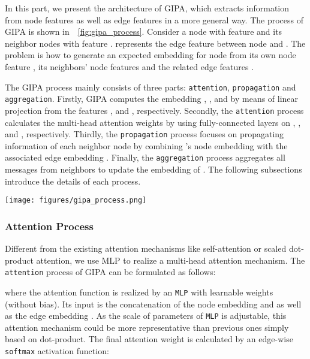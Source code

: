 \documentclass[sigconf]{acmart}
\newcommand{\model}{GIPA\xspace}
\begin{document}
In this part, we present the architecture of \model, which  extracts information from node features as well as edge features in a more general way. The process of \model is shown in~\figurename~\ref{fig:gipa_process}. Consider a node  with feature  and its neighbor nodes  with feature .  represents the edge feature between node  and . The problem is how to generate an expected embedding for node  from its own node feature , its neighbors' node features  and the related edge features . 

The \model process mainly consists of three parts: \texttt{attention}, \texttt{propagation} and \texttt{aggregation}. Firstly, \model computes the embedding , , and  by means of linear projection from the features ,  and , respectively. Secondly, the \texttt{attention} process calculates the multi-head attention weights by using fully-connected layers on , , and , respectively. Thirdly, the \texttt{propagation} process focuses on propagating information of each neighbor node  by combining 's node embedding  with the associated edge embedding . Finally, the \texttt{aggregation} process aggregates all messages from neighbors to update the embedding of . The following subsections introduce the details of each process.

\begin{figure*}
    \centering
    \texttt{[image: figures/gipa\_process.png]}
    \caption{Process of \model, which consists of \textit{attention}, \textit{propagation}, and \textit{aggregation} process.}
    \label{fig:gipa_process}
\end{figure*}

\subsubsection{Attention Process}

Different from the existing attention mechanisms like self-attention or scaled dot-product attention, we use MLP to realize a multi-head attention mechanism.
The \texttt{attention} process of \model can be formulated as follows:



\noindent where the attention function  is realized by an \texttt{MLP} with learnable weights  (without bias). Its input is the concatenation of the node embedding  and  as well as the edge embedding . As the scale of parameters of \texttt{MLP} is adjustable, this attention mechanism could be more representative than previous ones simply based on dot-product. The final attention weight is calculated by an edge-wise \texttt{softmax} activation function:
\end{document}

